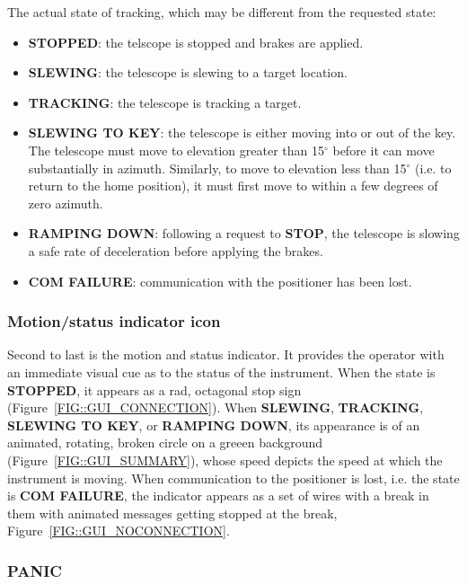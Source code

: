 \documentclass[letterpaper,12pt]{report}
\begin{document}
The actual state of tracking, which may be
different from the requested state:
\begin{itemize}
\item \textbf{STOPPED}: the telscope is stopped and brakes are applied.

\item \textbf{SLEWING}: the telescope is slewing to a target location.

\item \textbf{TRACKING}: the telescope is tracking a target. 

\item \textbf{SLEWING TO KEY}: the telescope is either moving
into or out of the key. The telescope must move to elevation greater
than 15$^\circ$ before it can move substantially in
azimuth. Similarly, to move to elevation less than 15$^\circ$ (i.e. to
return to the home position), it must first move to within a few
degrees of zero azimuth.

\item \textbf{RAMPING DOWN}: following a request to \textbf{STOP}, 
the telescope is slowing a safe rate of deceleration before applying
the brakes.

\item \textbf{COM FAILURE}: communication with the positioner has been 
lost.
\end{itemize}

\subsubsection{Motion/status indicator icon}
Second to last is the motion and status indicator. It provides the
operator with an immediate visual cue as to the status of the
instrument. When the state is
\textbf{STOPPED}, it appears as a rad, octagonal stop sign 
(Figure~\ref{FIG::GUI_CONNECTION}). When
\textbf{SLEWING}, \textbf{TRACKING}, \textbf{SLEWING TO KEY}, or
\textbf{RAMPING DOWN}, its appearance is of an animated, rotating, broken 
circle on a greeen background (Figure~\ref{FIG::GUI_SUMMARY}), whose speed
depicts the speed at which the instrument is moving. When
communication to the positioner is lost, i.e. the state is
\textbf{COM FAILURE}, the indicator appears as a set of wires with
a break in them with animated messages getting stopped at the break,
Figure~\ref{FIG::GUI_NOCONNECTION}.

\subsubsection{PANIC}
\end{document}
